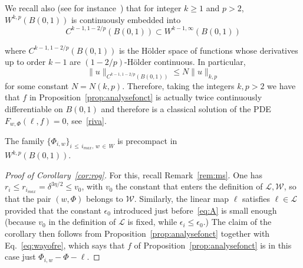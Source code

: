 \documentclass[AHL,Unicode,longabstracts,published]{cedram}
\newcommand{\clL}{\mathcal{L}}
\newcommand{\clW}{\mathcal{W}}
\begin{document}
\begin{rema}\label{rem:embed}
We recall also (see for instance~\cite[Th.~10.4.10]{krilov}) that for integer $k\ge1 $ and $p>2$, $W^{k,p}(B(0,1))$ is continuously embedded into
\begin{equation}
C^{k-1,1-2/p}(B(0,1))\subset W^{k-1,\infty}(B(0,1))
\end{equation}

where $C^{k-1,1-2/p}(B(0,1))$ is the H\"older space of functions whose derivatives up to order $k-1$ are $(1-2/p)$-H\"older continuous. In particular,
\begin{equation}\label{eq:sobolev}
\|u\|_{C^{k-1,1-2/p}(B(0,1))}\le N \|u\|_{k,p}
\end{equation}
for some constant $N=N(k,p)$. Therefore, taking the integers $k,p>2$ we have that $f$ in Proposition~\ref{prop:analysefonct} is actually twice continuously differentiable on $B(0,1)$ and therefore is a classical solution of the PDE $F_{w,\Phi}(\ell,f)=0$, see~\eqref{riva}.
\end{rema}


\begin{coro}\label{cor:rog}
The family $\{\Phi_{i,w}\}_{i\,\le\,i_{max},\,w\,\in\,W}$ is precompact in\\ $W^{k,p}(B(0,1))$.
\end{coro}

\begin{proof}[Proof of Corollary~\ref{cor:rog}]
For this, recall Remark~\ref{rem:ms}. One has $r_i\le r_{i_{max}}=\delta^{3\eta/2}\le v_0$, with $v_0$ the constant that enters the definition of $\clL,\clW$, so that the pair $(w,\Phi)$ belongs to $\clW$. Similarly, the linear map $\ell$ satisfies $\ell\in \clL$ provided that the constant $\epsilon_0$ introduced just before~\eqref{eq:A} is small enough (because $v_0$ in the definition of $\clL$ is fixed, while $\epsilon_i\le
\epsilon_0$.) The claim of the corollary then follows from Proposition~\ref{prop:analysefonct} together with Eq.~\eqref{eq:wayofre}, which says that $f$ of Proposition~\ref{prop:analysefonct} is in this case just $\Phi_{i,w}-\Phi-\ell$.
\end{proof}
\end{document}
